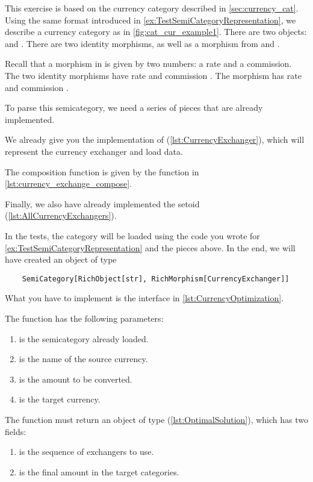 



This exercise is based on the currency category described in \cref{sec:currency_cat}.
Using the same format introduced in \cref{ex:TestSemiCategoryRepresentation}, we describe a currency category as in \cref{fig:cat_cur_example1}.
There are two objects:  and . There are two identity morphisms, as well as a morphism from  and .

Recall that a morphism in \Curr is given by two numbers: a rate and a commission. The two identity morphisms have rate  and commission .
The morphism  has rate  and commission .

To parse this semicategory, we need a series of pieces that are already implemented.

We already give you the implementation of  (\cref{lst:CurrencyExchanger}), which will represent the currency exchanger and load data.


The composition function is given by the function  in \cref{lst:currency_exchange_compose}.


Finally, we also have already implemented the setoid  (\cref{lst:AllCurrencyExchangers}).


In the tests, the category will be loaded using the code you wrote for \cref{ex:TestSemiCategoryRepresentation} and the pieces above.
In the end, we will have created an object of type
\begin{verbatim}
    SemiCategory[RichObject[str], RichMorphism[CurrencyExchanger]]
\end{verbatim}

What you have to implement is the interface in \cref{lst:CurrencyOptimization}.

The function  has the following parameters:
\begin{enumerate}
    \item {} is the semicategory already loaded.
    \item {} is the name of the source currency.
    \item {} is the amount to be converted.
    \item {} is the target currency.
\end{enumerate}
The function must return an object of type  (\cref{lst:OptimalSolution}), which has two fields:
\begin{enumerate}
    \item {} is the sequence of exchangers to use.
    \item {} is the final amount in the target categories.
\end{enumerate}

